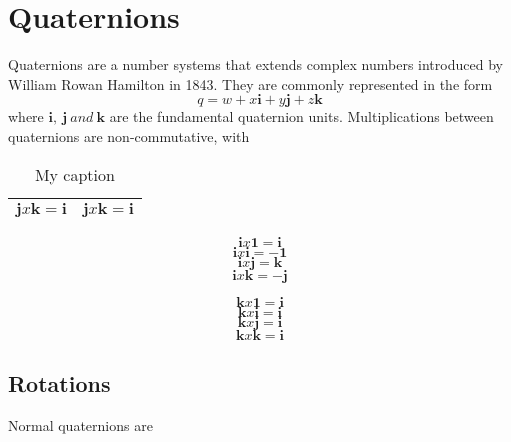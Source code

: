 
\chapter{Quaternions}
\label{ch:app:quaternions} 
Quaternions are a number systems that extends complex numbers introduced by William Rowan Hamilton in 1843. They are commonly represented in the form
\[ q = w + x\mathbf{i} + y\mathbf{j} + z\mathbf{k} \]
where $ \mathbf{i},\ \mathbf{j}\ and\ \mathbf{k} $ are the fundamental quaternion units.
Multiplications between quaternions are non-commutative, with
\begin{table}[]
	\centering
	\caption{My caption}
	\label{my-label}
	\begin{tabular}{|l|l|}
		\hline
		\[ \mathbf{j} x \mathbf{k} = \mathbf{i} \] & \[ \mathbf{j} x \mathbf{k} = \mathbf{i} \] \\ \hline
	\end{tabular}
\end{table}

\[ \mathbf{i} x \mathbf{1} = \mathbf{i} \]
\[ \mathbf{i} x \mathbf{i} = \mathbf{-1} \]
\[ \mathbf{i} x \mathbf{j} = \mathbf{k} \]
\[ \mathbf{i} x \mathbf{k} = \mathbf{-j} \]



\[ \mathbf{k} x \mathbf{1} = \mathbf{i} \]
\[ \mathbf{k} x \mathbf{i} = \mathbf{i} \]
\[ \mathbf{k} x \mathbf{j} = \mathbf{i} \]
\[ \mathbf{k} x \mathbf{k} = \mathbf{i} \]


\section{Rotations}
Normal quaternions are
